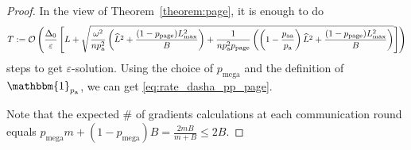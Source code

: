 \documentclass{article}
\newcommand*{\probavailable}{\ensuremath{p_{\textnormal{a}}}}
\newcommand*{\probpairaa}{\ensuremath{p_{\textnormal{aa}}}}
\newcommand*{\probpage}{\ensuremath{p_{\text{page}}}}
\newcommand*{\probmega}{\ensuremath{p_{\text{mega}}}}
\begin{document}
  \COROLLARYPAGE*

  \begin{proof}
    In the view of Theorem~\ref{theorem:page}, it is enough to do
    \begin{align*}
      T \eqdef \cO\left(\frac{\Delta_0}{\varepsilon}\left[L + \sqrt{\frac{\omega^2}{n \probavailable^2} \left(\widehat{L}^2 + \frac{(1 - \probpage)L_{\max}^2}{B}\right) + \frac{1}{n \probavailable^2 \probpage} \left(\left(1 - \frac{\probpairaa}{\probavailable}\right)\widehat{L}^2 + \frac{(1 - \probpage)L_{\max}^2}{B}\right)}\right]\right)
    \end{align*}
    steps to get $\varepsilon$-solution. Using the choice of $\probmega$ and the definition of $\mathbbm{1}_{\probavailable}$, we can get \eqref{eq:rate_dasha_pp_page}. 

    Note that the expected \# of gradients calculations at each communication round equals $\probmega m + (1 - \probmega) B = \frac{2 m B}{m + B} \leq 2 B.$
  \end{proof}

  \COROLLARYPAGERANDK*
\end{document}
